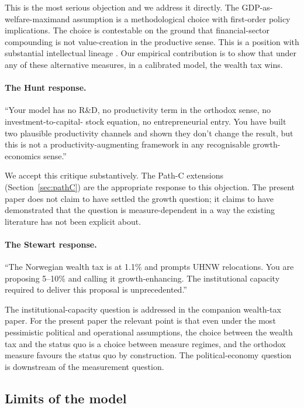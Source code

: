 \documentclass[11pt]{article}
\begin{document}
This is the most serious objection and we address it directly.  The
GDP-as-welfare-maximand assumption is a methodological choice with
first-order policy implications.  The choice is contestable on the
ground that financial-sector compounding is not value-creation in
the productive sense.  This is a position with substantial
intellectual lineage \citep{coyle2014gdp, pilling2018growth,
mazzucato2018value, stiglitz2009commission, sen1999development}.
Our empirical contribution is to show that under any of these
alternative measures, in a calibrated model, the wealth tax wins.

\paragraph{The Hunt response.}  ``Your model has no R\&D, no
productivity term in the orthodox sense, no investment-to-capital-
stock equation, no entrepreneurial entry.  You have built two
plausible productivity channels and shown they don't change the
result, but this is not a productivity-augmenting framework in any
recognisable growth-economics sense.''

We accept this critique substantively.  The Path-C extensions
(Section~\ref{sec:pathC}) are the appropriate response to this
objection.  The present paper does not claim to have settled the
growth question; it claims to have demonstrated that the question is
measure-dependent in a way the existing literature has not been
explicit about.

\paragraph{The Stewart response.}  ``The Norwegian wealth tax is at
1.1\% and prompts UHNW relocations.  You are proposing 5--10\% and
calling it growth-enhancing.  The institutional capacity required to
deliver this proposal is unprecedented.''

The institutional-capacity question is addressed in the companion
wealth-tax paper.  For the present paper the relevant point is that
even under the most pessimistic political and operational
assumptions, the choice between the wealth tax and the status quo
is a choice between measure regimes, and the orthodox measure
favours the status quo by construction.  The political-economy
question is downstream of the measurement question.

\subsection{Limits of the model}
\end{document}
